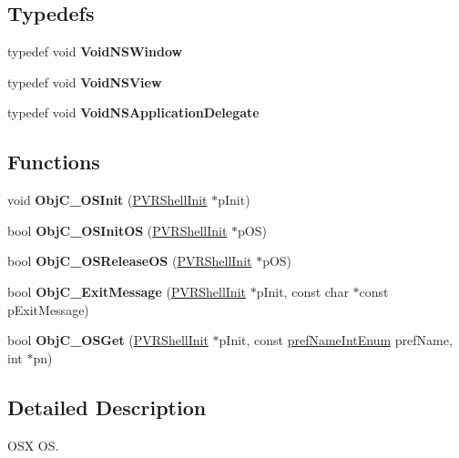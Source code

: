 \subsection*{Typedefs}
\begin{DoxyCompactItemize}
\item 
\hypertarget{group___o_s___o_s_x_gaa953f44f8cab4ec260bd493a2c8b6310}{typedef void {\bfseries Void\+N\+S\+Window}}\label{group___o_s___o_s_x_gaa953f44f8cab4ec260bd493a2c8b6310}

\item 
\hypertarget{group___o_s___o_s_x_ga969ae96d7d83974413748dcf81e232df}{typedef void {\bfseries Void\+N\+S\+View}}\label{group___o_s___o_s_x_ga969ae96d7d83974413748dcf81e232df}

\item 
\hypertarget{group___o_s___o_s_x_gaa142ff01bae4d7634115efbf09048543}{typedef void {\bfseries Void\+N\+S\+Application\+Delegate}}\label{group___o_s___o_s_x_gaa142ff01bae4d7634115efbf09048543}

\end{DoxyCompactItemize}
\subsection*{Functions}
\begin{DoxyCompactItemize}
\item 
\hypertarget{group___o_s___o_s_x_ga72dbae423e8a151eb03290dc45506cff}{void {\bfseries Obj\+C\+\_\+\+O\+S\+Init} (\hyperlink{class_p_v_r_shell_init}{P\+V\+R\+Shell\+Init} $\ast$p\+Init)}\label{group___o_s___o_s_x_ga72dbae423e8a151eb03290dc45506cff}

\item 
\hypertarget{group___o_s___o_s_x_ga38edd3605d5a6f4b8b16e6463db4bc1b}{bool {\bfseries Obj\+C\+\_\+\+O\+S\+Init\+O\+S} (\hyperlink{class_p_v_r_shell_init}{P\+V\+R\+Shell\+Init} $\ast$p\+O\+S)}\label{group___o_s___o_s_x_ga38edd3605d5a6f4b8b16e6463db4bc1b}

\item 
\hypertarget{group___o_s___o_s_x_ga88e81cdcfd9738f30faa213bdc920013}{bool {\bfseries Obj\+C\+\_\+\+O\+S\+Release\+O\+S} (\hyperlink{class_p_v_r_shell_init}{P\+V\+R\+Shell\+Init} $\ast$p\+O\+S)}\label{group___o_s___o_s_x_ga88e81cdcfd9738f30faa213bdc920013}

\item 
\hypertarget{group___o_s___o_s_x_gad02f32636b0fdd3292d2bd5ba24a2eca}{bool {\bfseries Obj\+C\+\_\+\+Exit\+Message} (\hyperlink{class_p_v_r_shell_init}{P\+V\+R\+Shell\+Init} $\ast$p\+Init, const char $\ast$const p\+Exit\+Message)}\label{group___o_s___o_s_x_gad02f32636b0fdd3292d2bd5ba24a2eca}

\item 
\hypertarget{group___o_s___o_s_x_gaf66805d74f4d281332a3185eca2f4b22}{bool {\bfseries Obj\+C\+\_\+\+O\+S\+Get} (\hyperlink{class_p_v_r_shell_init}{P\+V\+R\+Shell\+Init} $\ast$p\+Init, const \hyperlink{_p_v_r_shell_8h_a78ec4653192043575302f1448ae7054e}{pref\+Name\+Int\+Enum} pref\+Name, int $\ast$pn)}\label{group___o_s___o_s_x_gaf66805d74f4d281332a3185eca2f4b22}

\end{DoxyCompactItemize}


\subsection{Detailed Description}
O\+S\+X O\+S. 

